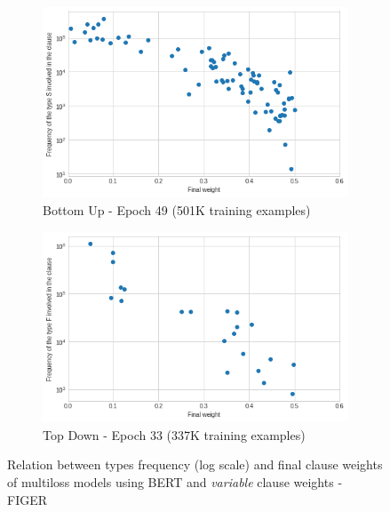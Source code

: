\begin{figure}[bth]
     \centering
     \begin{subfigure}[b]{0.7\textwidth}
         \centering
         \includegraphics[width=\textwidth]{figures/weight_freq_bert_figer_bu_multiloss_variable.png}
         \caption{Bottom Up - Epoch 49 (501K training examples)}
         \label{fig:weight_freq_bert_figer_bu_multiloss_variable}
         \vspace{10px}
     \end{subfigure}
     \begin{subfigure}[b]{0.7\textwidth}
         \centering
         \includegraphics[width=\textwidth]{figures/weight_freq_bert_figer_td_multiloss_variable.png}
         \caption{Top Down - Epoch 33 (337K training examples)}
         \label{fig:weight_freq_bert_figer_td_multiloss_variable}
     \end{subfigure}
    \caption{Relation between types frequency (log scale) and final clause weights of multiloss models using BERT and \textit{variable} clause weights - FIGER}
    \label{fig:weight_freq_bert_figer_variable}
\end{figure}


